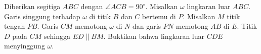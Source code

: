 Diberikan segitiga $ABC$ dengan $\angle ACB = 90^\circ$. Misalkan $\omega$ lingkaran luar $ABC$. Garis singgung terhadap $\omega$ di titik $B$ dan $C$ bertemu di $P$. Misalkan $M$ titik tengah $PB$. Garis $CM$ memotong $\omega$ di $N$ dan garis $PN$ memotong $AB$ di $E$. Titik $D$ pada $CM$ sehingga $ED \parallel BM$. Buktikan bahwa lingkaran luar $CDE$ menyinggung $\omega$.
